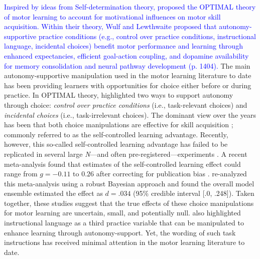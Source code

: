 \documentclass[man,floatsintext,donotrepeattitle,letterpaper,12pt]{apa7}
\begin{document}
\textcolor{blue}{Inspired by ideas from Self-determination theory, \textcite{wulf2016} proposed the OPTIMAL theory of motor learning to account for motivational influences on motor skill acquisition. Within their theory, Wulf and Lewthwaite proposed that autonomy-supportive practice conditions (e.g., control over practice conditions, instructional language, incidental choices) benefit motor performance and learning through enhanced expectancies, efficient goal-action coupling, and dopamine availability for memory consolidation and neural pathway development (p. 1404).} The main autonomy-supportive manipulation used in the motor learning literature to date has been providing learners with opportunities for choice either before or during practice. In OPTIMAL theory, \textcite{wulf2016} highlighted two ways to support autonomy through choice: \emph{control over practice conditions} (i.e., task-relevant choices) and \emph{incidental choices} (i.e., task-irrelevant choices). The dominant view over the years has been that both choice manipulations are effective for skill acquisition \autocite[e.g.,][]{carter2014,carter2017,chiviacowsky2002,chiviacowsky2005,lewthwaite2015,wulf2014,wulf2018}; commonly referred to as the self-controlled learning advantage. Recently, however, this so-called self-controlled learning advantage has failed to be replicated in several large \emph{N}---and often pre-registered---experiments \autocite{bacelar2022,leiker2019,mckay2020,mckay2022,stgermain2022,stgermain2023,yantha2022}. A recent meta-analysis found that estimates of the self-controlled learning effect could range from $g = -0.11 \text{ to } 0.26$ after correcting for publication bias \autocite{mckay2022a}. \textcite{mckay2023} re-analyzed this meta-analysis using a robust Bayesian approach \autocite{bartos2023,maier2023} and found the overall model ensemble estimated the effect as $d = .034$ (95\% credible interval [.0, .248]). Taken together, these studies suggest that the true effects of these choice manipulations for motor learning are uncertain, small, and potentially null. \textcite{wulf2016} also highlighted instructional language as a third practice variable that can be manipulated to enhance learning through autonomy-support. Yet, the wording of such task instructions has received minimal attention in the motor learning literature to date.
\end{document}
